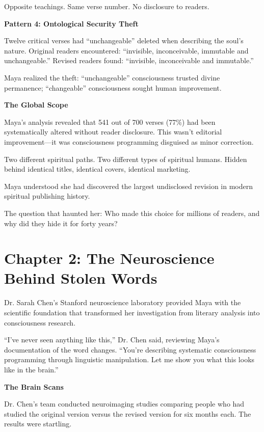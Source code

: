 \documentclass[11pt,twoside]{book}
\begin{document}
Opposite teachings. Same verse number. No disclosure to readers.

\textbf{Pattern 4: Ontological Security Theft}

Twelve critical verses had ``unchangeable'' deleted when describing the soul's nature. Original readers encountered: ``invisible, inconceivable, immutable and unchangeable.'' Revised readers found: ``invisible, inconceivable and immutable.''

Maya realized the theft: ``unchangeable'' consciousness trusted divine permanence; ``changeable'' consciousness sought human improvement.

\textbf{The Global Scope}

Maya's analysis revealed that 541 out of 700 verses (77\%) had been systematically altered without reader disclosure. This wasn't editorial improvement—it was consciousness programming disguised as minor correction.

Two different spiritual paths. Two different types of spiritual humans. Hidden behind identical titles, identical covers, identical marketing.

Maya understood she had discovered the largest undisclosed revision in modern spiritual publishing history.

The question that haunted her: Who made this choice for millions of readers, and why did they hide it for forty years?

\chapter*{Chapter 2: The Neuroscience Behind Stolen Words}

Dr. Sarah Chen's Stanford neuroscience laboratory provided Maya with the scientific foundation that transformed her investigation from literary analysis into consciousness research.

``I've never seen anything like this,'' Dr. Chen said, reviewing Maya's documentation of the word changes. ``You're describing systematic consciousness programming through linguistic manipulation. Let me show you what this looks like in the brain.''

\textbf{The Brain Scans}

Dr. Chen's team conducted neuroimaging studies comparing people who had studied the original version versus the revised version for six months each. The results were startling.
\end{document}
